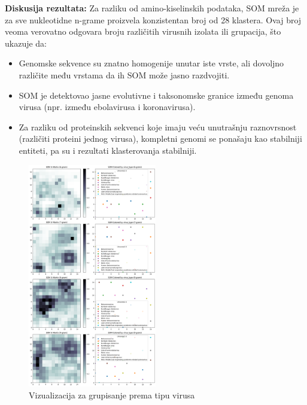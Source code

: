 \documentclass[a4paper,12pt]{article}
\begin{document}
\textbf{Diskusija rezultata:}
Za razliku od amino-kiselinskih podataka, SOM mreža je za sve nukleotidne n-grame proizvela konzistentan broj od 28 klastera. Ovaj broj veoma verovatno odgovara broju različitih virusnih izolata ili grupacija, što ukazuje da:

\begin{itemize}
    \item Genomske sekvence su znatno homogenije unutar iste vrste, ali dovoljno različite među vrstama da ih SOM može jasno razdvojiti.
    \item SOM je detektovao jasne evolutivne i taksonomske granice između genoma virusa (npr. između ebolavirusa i koronavirusa).
    \item Za razliku od proteinskih sekvenci koje imaju veću unutrašnju raznovrsnost (različiti proteini jednog virusa), kompletni genomi se ponašaju kao stabilniji entiteti, pa su i rezultati klasterovanja stabilniji.
\end{itemize}

\begin{figure}[h!]
    \centering
    \includegraphics[width=0.5\textwidth]{images/nucleotide-virus.png}
    \caption{Vizualizacija za grupisanje prema tipu virusa}
    \label{fig:som-struktura}
\end{figure}
\end{document}
